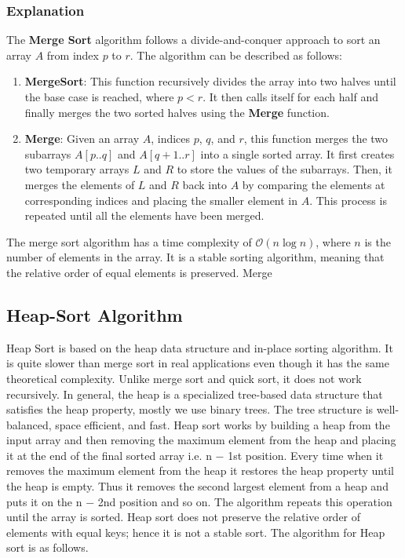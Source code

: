 \documentclass{article}
\begin{document}
\subsubsection{Explanation}


The \textbf{Merge Sort} algorithm follows a divide-and-conquer approach to sort an array $A$ from index $p$ to $r$. The algorithm can be described as follows:

\begin{enumerate}
    \item \textbf{MergeSort}: This function recursively divides the array into two halves until the base case is reached, where $p < r$. It then calls itself for each half and finally merges the two sorted halves using the \textbf{Merge} function.
    \item \textbf{Merge}: Given an array $A$, indices $p$, $q$, and $r$, this function merges the two subarrays $A[p..q]$ and $A[q+1..r]$ into a single sorted array. It first creates two temporary arrays $L$ and $R$ to store the values of the subarrays. Then, it merges the elements of $L$ and $R$ back into $A$ by comparing the elements at corresponding indices and placing the smaller element in $A$. This process is repeated until all the elements have been merged.
\end{enumerate}

The merge sort algorithm has a time complexity of $\mathcal{O}(n\log n)$, where $n$ is the number of elements in the array. It is a stable sorting algorithm, meaning that the relative order of equal elements is preserved. Merge







\subsection{Heap-Sort Algorithm}

Heap Sort is based on the heap data structure and in-place sorting algorithm.
It is quite slower than merge sort in real applications even though it has the same
theoretical complexity. Unlike merge sort and quick sort, it does not work recursively.
In general, the heap is a specialized tree-based data structure that satisfies the heap
property, mostly we use binary trees. The tree structure is well-balanced, space
efficient, and fast. Heap sort works by building a heap from the input array and
then removing the maximum element from the heap and placing it at the end of the
final sorted array i.e. n − 1st position. Every time when it removes the maximum
element from the heap it restores the heap property until the heap is empty. Thus it
removes the second largest element from a heap and puts it on the n − 2nd position
and so on. The algorithm repeats this operation until the array is sorted. Heap
sort does not preserve the relative order of elements with equal keys; hence it is not
a stable sort. The algorithm for Heap sort is as follows.\cite{karunanithi2014survey}
\end{document}
